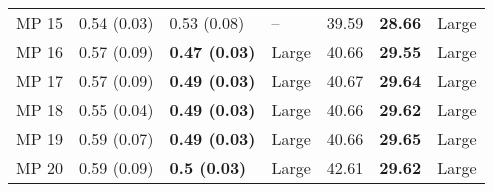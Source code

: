 \begin{tabular}{lllllll}
 MP 15 &       0.54 (0.03) &           0.53 (0.08) &          -- &                   39.59 &           \textbf{28.66} &       Large \\
 MP 16 &       0.57 (0.09) &  \textbf{0.47 (0.03)} &       Large &                   40.66 &           \textbf{29.55} &       Large \\
 MP 17 &       0.57 (0.09) &  \textbf{0.49 (0.03)} &       Large &                   40.67 &           \textbf{29.64} &       Large \\
 MP 18 &       0.55 (0.04) &  \textbf{0.49 (0.03)} &       Large &                   40.66 &           \textbf{29.62} &       Large \\
 MP 19 &       0.59 (0.07) &  \textbf{0.49 (0.03)} &       Large &                   40.66 &           \textbf{29.65} &       Large \\
 MP 20 &       0.59 (0.09) &   \textbf{0.5 (0.03)} &       Large &                   42.61 &           \textbf{29.62} &       Large \\
\bottomrule
\end{tabular}
